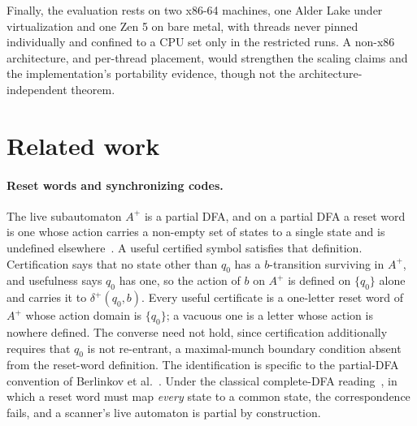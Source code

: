 \documentclass[11pt,a4paper]{article}
\theoremstyle{definition}
\theoremstyle{plain}
\begin{document}
Finally, the evaluation rests on two x86-64 machines, one Alder Lake under virtualization and one Zen 5 on bare metal,
with threads never pinned individually and confined to a CPU set only in the restricted runs. A non-x86 architecture,
and per-thread placement, would strengthen the scaling claims and the implementation's portability evidence, though not
the architecture-independent theorem.

\section{Related work}
\label{sec:related}

\paragraph{Reset words and synchronizing codes.} The live subautomaton $A^+$ is a partial DFA, and on a partial DFA a
reset word is one whose action carries a non-empty set of states to a single state and is undefined
elsewhere~\cite{berlinkov2021partial}. A useful certified symbol satisfies that definition. Certification says that no
state other than $q_0$ has a $b$-transition surviving in $A^+$, and usefulness says $q_0$ has one, so the action of $b$
on $A^+$ is defined on $\{q_0\}$ alone and carries it to $\delta^+(q_0, b)$. Every useful certificate is a one-letter
reset word of $A^+$ whose action domain is $\{q_0\}$; a vacuous one is a letter whose action is nowhere defined. The
converse need not hold, since certification additionally requires that $q_0$ is not re-entrant, a maximal-munch boundary
condition absent from the reset-word definition. The identification is specific to the partial-DFA convention of
Berlinkov et al.~\cite{berlinkov2021partial}. Under the classical complete-DFA reading~\cite{volkov2008synchronizing},
in which a reset word must map \emph{every} state to a common state, the correspondence fails, and a scanner's live
automaton is partial by construction.
\end{document}
